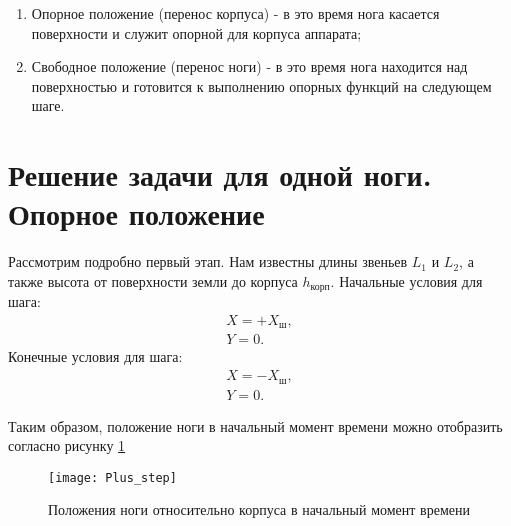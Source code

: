 \begin{enumerate} 
	\item Опорное положение (перенос корпуса) - в это время нога касается поверхности и служит опорной для корпуса аппарата;
	\item Свободное положение (перенос ноги) - в это время нога находится над поверхностью и готовится к выполнению опорных функций на следующем шаге.
\end{enumerate}

\section{Решение задачи для одной ноги. Опорное положение}\label{C3_2}
Рассмотрим подробно первый этап. Нам известны длины звеньев $L_{1}$ и $L_{2}$, а также высота от поверхности земли до корпуса $h_{\text{корп}}$. 
Начальные условия для шага:
\begin{equation}
	\begin{array}{l}
		X = +X_{\text{ш}},
		\\
		Y = 0.
	\end{array}
\end{equation}
Конечные условия для шага:
\begin{equation}
	\begin{array}{l}
		X = -X_{\text{ш}},
		\\
		Y = 0.
	\end{array}
	\label{gran_step}
\end{equation}

Таким образом, положение ноги в начальный момент времени можно отобразить согласно рисунку \ref{Plus_step}
\newline
\begin{figure}[h]
	\begin{center}
		\texttt{[image: Plus\_step]}
		\caption{Положения ноги относительно корпуса в начальный момент времени}
		\label{Plus_step}
	\end{center}
\end{figure}

